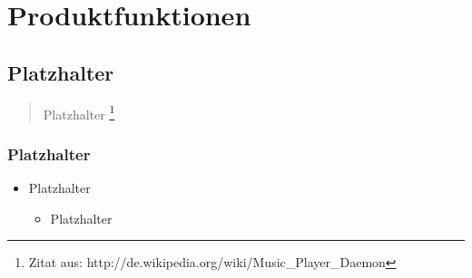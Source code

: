 \chapter{Produktfunktionen}

\section{Platzhalter}

\begin{quote}
Platzhalter
\footnote{Zitat aus: http://de.wikipedia.org/wiki/Music\_Player\_Daemon}
\end{quote}

\newpage
\subsection{Platzhalter}

\renewcommand{\labelitemi}{•}
\begin{itemize}
	\item Platzhalter
	
	\renewcommand{\labelitemi}{--}
	\begin{itemize}
		\item Platzhalter
	\end{itemize}
\end{itemize}
